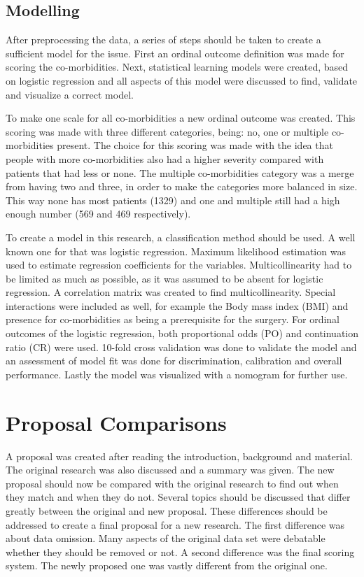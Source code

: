 \documentclass[10pt,a4paper]{report}
\begin{document}
	\subsection{Modelling}
	
	After preprocessing the data, a series of steps should be taken to create a sufficient model for the issue. First an ordinal outcome definition was made for scoring the co-morbidities. Next, statistical learning models were created, based on logistic regression and all aspects of this model were discussed to find, validate and visualize a correct model.
	
	To make one scale for all co-morbidities a new ordinal outcome was created. This scoring was made with three different categories, being: no, one or multiple co-morbidities present. The choice for this scoring was made with the idea that people with more co-morbidities also had a higher severity compared with patients that had less or none. The multiple co-morbidities category was a merge from having two and three, in order to make the categories more balanced in size. This way none has most patients (1329) and one and multiple still had a high enough number (569 and 469 respectively). 
	
	To create a model in this research, a classification method should be used. A well known one for that was logistic regression. Maximum likelihood estimation was used to estimate regression coefficients for the variables. Multicollinearity had to be limited as much as possible, as it was assumed to be absent for logistic regression. A correlation matrix was created to find multicollinearity. Special interactions were included as well, for example the Body mass index (BMI) and presence for co-morbidities as being a prerequisite for the surgery. For ordinal outcomes of the logistic regression, both proportional odds (PO) and continuation ratio (CR) were used. 10-fold cross validation was done to validate the model and an assessment of model fit was done for discrimination, calibration and overall performance. Lastly the model was visualized with a nomogram for further use.
	
	\clearpage
	
	\section{Proposal Comparisons}
	\label{sec:ProposalComparisons}
	
	A proposal was created after reading the introduction, background and material. The original research was also discussed and a summary was given. The new proposal should now be compared with the original research to find out when they match and when they do not. Several topics should be discussed that differ greatly between the original and new proposal. These differences should be addressed to create a final proposal for a new research. The first difference was about data omission. Many aspects of the original data set were debatable whether they should be removed or not. A second difference was the final scoring system. The newly proposed one was vastly different from the original one.
	
\end{document}
